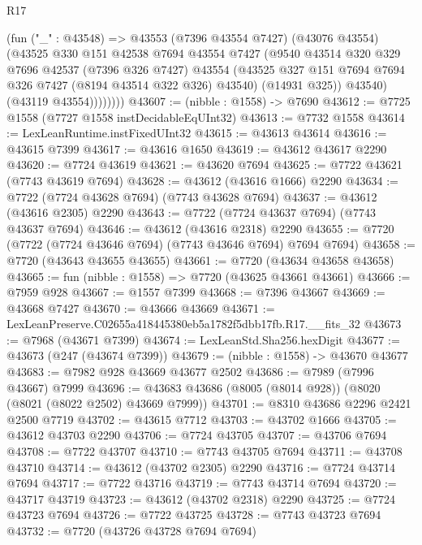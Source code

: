 \begin{lexlean}{R17}
\begin{coremodule}
                (fun ("_" : @43548) =>
                @43553
                  (@7396 @43554 @7427)
                  (@43076 @43554)
                  (@43525
                    @330
                    @151
                    @42538
                    @7694
                    @43554
                    @7427
                    (@9540
                      @43514
                      @320
                      @329
                      @7696
                      @42537
                      (@7396 @326 @7427)
                      @43554
                      (@43525 @327 @151 @7694 @7694 @326 @7427 (@8194 @43514 @322 @326) @43540)
                      (@14931 @325))
                    @43540)
                  (@43119 @43554))))))))
@43607 := (nibble : @1558) -> @7690
@43612 := @7725 @1558 (@7727 @1558 instDecidableEqUInt32)
@43613 := @7732 @1558
@43614 := LexLeanRuntime.instFixedUInt32
@43615 := @43613 @43614
@43616 := @43615 @7399
@43617 := @43616 @1650
@43619 := @43612 @43617 @2290
@43620 := @7724 @43619
@43621 := @43620 @7694
@43625 := @7722 @43621 (@7743 @43619 @7694)
@43628 := @43612 (@43616 @1666) @2290
@43634 := @7722 (@7724 @43628 @7694) (@7743 @43628 @7694)
@43637 := @43612 (@43616 @2305) @2290
@43643 := @7722 (@7724 @43637 @7694) (@7743 @43637 @7694)
@43646 := @43612 (@43616 @2318) @2290
@43655 := @7720 (@7722 (@7724 @43646 @7694) (@7743 @43646 @7694) @7694 @7694)
@43658 := @7720 (@43643 @43655 @43655)
@43661 := @7720 (@43634 @43658 @43658)
@43665 := fun (nibble : @1558) => @7720 (@43625 @43661 @43661)
@43666 := @7959 @928
@43667 := @1557 @7399
@43668 := @7396 @43667
@43669 := @43668 @7427
@43670 := @43666 @43669
@43671 := LexLeanPreserve.C02655a418445380eb5a1782f5dbb17fb.R17.__fits_32
@43673 := @7968 (@43671 @7399)
@43674 := LexLeanStd.Sha256.hexDigit
@43677 := @43673 (@247 (@43674 @7399))
@43679 := (nibble : @1558) -> @43670 @43677
@43683 := @7982 @928 @43669 @43677 @2502
@43686 := @7989 (@7996 @43667) @7999
@43696 := @43683 @43686 (@8005 (@8014 @928)) (@8020 (@8021 (@8022 @2502) @43669 @7999))
@43701 := @8310 @43686 @2296 @2421 @2500 @7719
@43702 := @43615 @7712
@43703 := @43702 @1666
@43705 := @43612 @43703 @2290
@43706 := @7724 @43705
@43707 := @43706 @7694
@43708 := @7722 @43707
@43710 := @7743 @43705 @7694
@43711 := @43708 @43710
@43714 := @43612 (@43702 @2305) @2290
@43716 := @7724 @43714 @7694
@43717 := @7722 @43716
@43719 := @7743 @43714 @7694
@43720 := @43717 @43719
@43723 := @43612 (@43702 @2318) @2290
@43725 := @7724 @43723 @7694
@43726 := @7722 @43725
@43728 := @7743 @43723 @7694
@43732 := @7720 (@43726 @43728 @7694 @7694)

\end{coremodule}
\end{lexlean}
